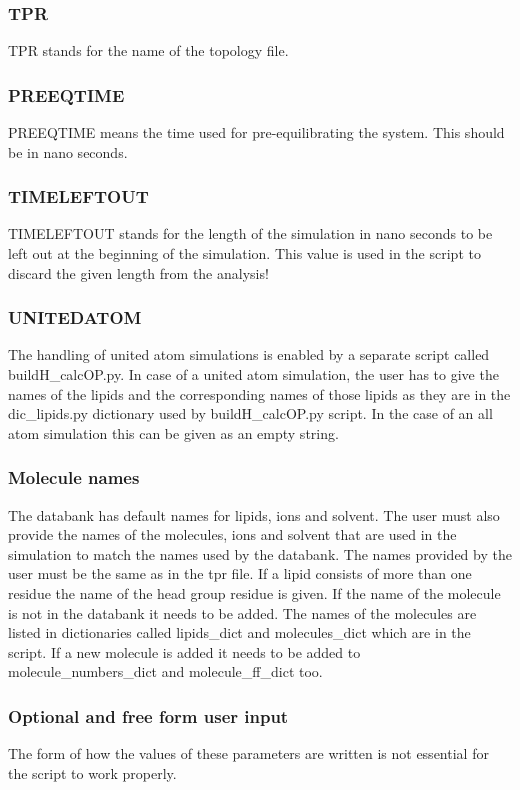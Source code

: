 \documentclass[fleqn,10pt]{wlscirep}
\begin{document}
\subsubsection*{TPR}
TPR stands for the name of the topology file.

\subsubsection*{PREEQTIME}
PREEQTIME means the time used for pre-equilibrating the system. This should be in nano seconds. 
\subsubsection*{TIMELEFTOUT}
TIMELEFTOUT stands for the length of the simulation in nano seconds to be left out at the beginning of the simulation. This value is used in the script to discard the given length from the analysis!

\subsubsection*{UNITEDATOM}
The handling of united atom simulations is enabled by a separate script called buildH\_calcOP.py. In case of a united atom simulation, the user has to give the names of the lipids and the corresponding names of those lipids as they are in the dic\_lipids.py dictionary used by buildH\_calcOP.py script. In the case of an all atom simulation this can be given as an empty string.

\subsubsection*{Molecule names}
The databank has default names for lipids, ions and solvent. The user must also provide the names of the molecules, ions and solvent that are used in the simulation to match the names used by the databank. The names provided by the user must be the same as in the tpr file. If a lipid consists of more than one residue the name of the head group residue is given. If the name of the molecule is not in the databank it needs to be added. The names of the molecules are listed in dictionaries called lipids\_dict and molecules\_dict which are in the script. If a new molecule is added it needs to be added to molecule\_numbers\_dict and molecule\_ff\_dict too.

\subsubsection{Optional and free form user input}
The form of how the values of these parameters are written is not essential for the script to work properly.
\end{document}
